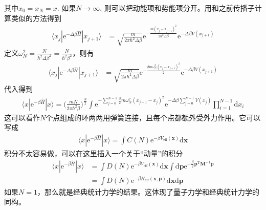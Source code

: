         其中$x_0=x_N = x$. 如果$N \to \infty$, 则可以把动能项和势能项分开。用和之前传播子计算类似的方法得到
        \begin{equation}\begin{aligned}
            \langle x_j|\mathrm{e}^{-\Delta \beta \hat{H}} |x_{j+1} \rangle &= \sqrt{\frac m{2\pi \hbar^2 \Delta \beta}} \mathrm{e}^{-\frac {m(x_j- x_{j+1})^2}{2\hbar^2 \Delta \beta}} \mathrm{e}^{-\Delta \beta V(x_{j+1})}
        \end{aligned}\end{equation}
        定义$\omega_N^2 = \frac N{\hbar^2 \Delta \beta^2} = \frac N{\hbar^2 \beta^2}$，则有
        \begin{equation}\begin{aligned}
            \langle x_j|\mathrm{e}^{-\Delta \beta \hat{H}} |x_{j+1} \rangle &= \sqrt{\frac m{2\pi \hbar^2 \Delta \beta}} \mathrm{e}^{-\frac {\beta m\omega_N^2(x_j- x_{j+1})^2}{2}} \mathrm{e}^{-\Delta \beta V(x_{j+1})}
        \end{aligned}\end{equation}
        代入得到 
        \begin{equation}\begin{aligned}
            \langle x|\mathrm{e}^{-\beta \hat{H}}|x\rangle  = \bigg(\frac {mN}{2\pi \hbar^2 \beta}\bigg)^{\frac N2} \int \mathrm{e}^{-\sum_{j=0}^{N-1} \frac {\beta}2 m \omega_N^2 (x_{j+1} - x_j)^2} \mathrm{e}^{-\Delta \beta \sum_{j=0}^{N-1}V(x_j)}\prod_{i=1}^{N-1}\mathrm{d}x_i
        \end{aligned}\end{equation}
        这可以看作$N$个点组成的环两两用弹簧连接，且每个点都额外受外力作用。它可以写成
        \begin{equation}\begin{aligned}
            \langle x|\mathrm{e}^{-\beta \hat{H}}|x\rangle  = \int C(N) \mathrm{e}^{-\beta V_{\mathrm{eff}}(\bm{x})} \mathrm{d}\bm{x}
        \end{aligned}\end{equation}
        积分不太容易做，可以在这里插入一个关于“动量”的积分
        \begin{equation}\begin{aligned}
            \langle x|\mathrm{e}^{-\beta \hat{H}}|x\rangle  &= \int D(N) \mathrm{e}^{-\beta V_{\mathrm{eff}}(\bm{x})} \mathrm{d}\bm{x} \int \mathrm{d}\bm{p} \mathrm{e}^{-\frac {\beta}2 \bm{p}^{\mathrm{T}}\bm{M}^{-1} \bm{p}}\\
            &= \int D(N) \mathrm{e}^{-\beta H_{\mathrm{eff}}(\bm{x,p})} \mathrm{d}\bm{x} \mathrm{d}\bm{p}
        \end{aligned}\end{equation}
        如果$N=1$，那么就是经典统计力学的结果。这体现了量子力学和经典统计力学的同构。

